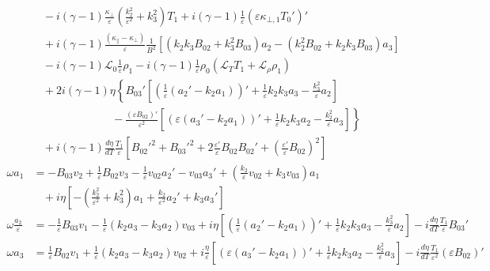 \documentclass[11pt, fleqn]{article}
\newcommand{\HL}{\mathscr{L}}
\newcommand{\eps}{\varepsilon}
\begin{document}
\begin{align*}
									&~~~~ - i(\gamma - 1)\frac{\kappa_\bot}{\eps}\left(\frac{k_2^2}{\eps^2} + k_3^2\right)T_1 + i(\gamma - 1)\frac{1}{\eps}\left(\eps\kappa_{\bot, 1}T_0'\right)'						\\
									&~~~~ + i(\gamma - 1)\frac{(\kappa_\parallel - \kappa_\bot)}{\eps}\frac{1}{B^2}\left[\left(k_2k_3B_{02} + k_3^2B_{03}\right)a_2 - \left(k_2^2B_{02} + k_2k_3B_{03}\right)a_3\right]	\\
									&~~~~ - i(\gamma - 1)\HL_0\frac{1}{\eps}\rho_1 - i(\gamma - 1)\frac{1}{\eps}\rho_0\left(\HL_T T_1 + \HL_\rho\rho_1\right)															\\
									&~~~~ +2i(\gamma - 1)\eta\left\{B_{03}'\left[\left(\frac{1}{\eps}\left(a_2' - k_2a_1\right)\right)' + \frac{1}{\eps}k_2k_3a_3 - \frac{k_3^2}{\eps}a_2\right]	\right.				\\
									&~~~~ \left. \qquad\qquad\qquad ~ -\frac{(\eps B_{02})'}{\eps^2}\left[\left(\eps\left(a_3' - k_2a_1\right)\right)' + \frac{1}{\eps}k_2k_3a_2 - \frac{k_2^2}{\eps}a_3\right]\right\} \\
									&~~~~ + i(\gamma - 1)\frac{d\eta}{dT}\frac{T_1}{\eps}\left[B_{02}'^2 + B_{03}'^2 + 2\frac{\eps'}{\eps}B_{02}B_{02}' + \left(\frac{\eps'}{\eps}B_{02}\right)^2\right]				\\[8pt]
	\omega a_1						&= -B_{03}v_2 + \frac{1}{\eps}B_{02}v_3 - \frac{1}{\eps}v_{02}a_2' - v_{03}a_3' + \left(\frac{k_2}{\eps}v_{02} + k_3v_{03}\right)a_1												\\
									&~~~~ +i\eta\left[-\left(\frac{k_2^2}{\eps^2} + k_3^2\right)a_1 + \frac{k_2}{\eps^2}a_2' + k_3a_3'\right]																			\\[8pt]
	\omega \frac{a_2}{\eps}			&= -\frac{1}{\eps}B_{03}v_1 - \frac{1}{\eps}\left(k_2a_3 -k_3a_2\right)v_{03} 
								  + i\eta\left[\left(\frac{1}{\eps}(a_2' - k_2a_1)\right)' + \frac{1}{\eps}k_2k_3a_3 - \frac{k_3^2}{\eps}a_2\right] - i\frac{d\eta}{dT}\frac{T_1}{\eps}B_{03}'							\\[8pt]
	\omega a_3						&= \frac{1}{\eps}B_{02}v_1 + \frac{1}{\eps}\left(k_2a_3 - k_3a_2\right)v_{02}				
								  + i\frac{\eta}{\eps}\left[\left(\eps(a_3' - k_2a_1)\right)' + \frac{1}{\eps}k_2k_3a_2 - \frac{k_2^2}{\eps}a_3\right] - i\frac{d\eta}{dT}\frac{T_1}{\eps^2}(\eps B_{02})'
\end{align*}
\endgroup
\end{document}
